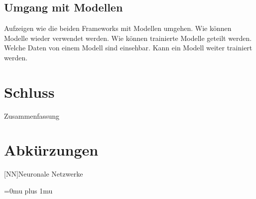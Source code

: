 \documentclass[a4paper,oneside, 12pt]{report}
\begin{document}
\section{Umgang mit Modellen}
Aufzeigen wie die beiden Frameworks mit Modellen umgehen. Wie können Modelle wieder verwendet werden. Wie können trainierte Modelle geteilt werden. Welche Daten von einem Modell sind einsehbar. Kann ein Modell weiter trainiert werden.

\chapter{Schluss}\label{sec:schluss}
Zusammenfassung



\cleardoublepage
{}
{}
\chapter*{Abkürzungen}
\begin{acronym}[Abkürzungen]
    [NN]{Neuronale Netzwerke}
\end{acronym}

\cleardoublepage
{}
{}
\Urlmuskip=0mu plus 1mu\relax
\end{document}

